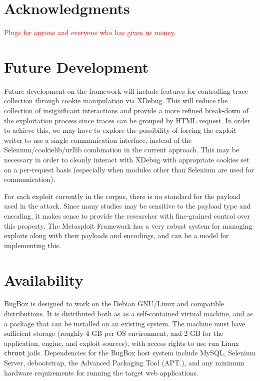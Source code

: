 \documentclass[letterpaper,twocolumn,10pt]{article}
\begin{document}
\section{Acknowledgments}

\textcolor{red} {Plugs for anyone and everyone who has given us money.}

\section{Future Development}
  Future development on the framework will include features for controlling trace collection through cookie manipulation via XDebug. This will reduce the collection of insignificant interactions and provide a more refined break-down of the exploitation process since traces can be grouped by HTML request. In order to achieve this, we may have to explore the possibility of forcing the exploit writer to use a single communication interface, instead of the Selenium/cookielib/urllib combination in the current approach. This may be necessary in order to cleanly interact with XDebug with appropriate cookies set on a per-request basis (especially when modules other than Selenium are used for communication).\par
For each exploit currently in the corpus, there is no standard for the payload used in the attack. Since many studies may be sensitive to the payload type and encoding, it makes sense to provide the researcher with fine-grained control over this property. The Metasploit Framework has a very robust system for managing exploits along with their payloads and encodings, and can be a model for implementing this.

\section{Availability}

BugBox is designed to work on the Debian GNU/Linux and compatible distributions.  It is distributed both as as a self-contained virtual machine, and as a package that can be installed on an existing system. The machine must have sufficient storage (roughly 4 GB per OS environment, and 2 GB for the application, engine, and exploit sources), with access rights to use run Linux {\tt chroot} jails.  Dependencies for the BugBox host system include MySQL, Selenium Server, debootstrap, the Advanced Packaging Tool (APT.), and any minimum hardware requirements for running the target web applications.\par
\end{document}
